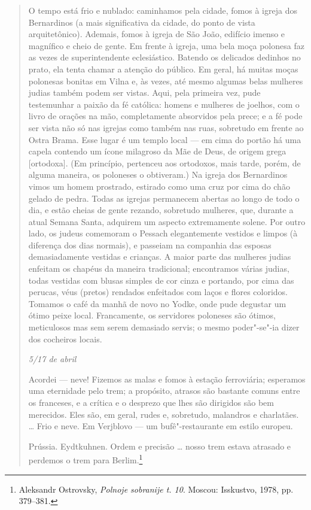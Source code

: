 \begin{quote}
O tempo está frio e nublado: caminhamos pela cidade, fomos à igreja dos
Bernardinos (a mais significativa da cidade, do ponto de vista
arquitetônico). Ademais, fomos à igreja de São João, edifício imenso e
magnífico e cheio de gente. Em frente à igreja, uma bela moça polonesa
faz as vezes de superintendente eclesiástico. Batendo os delicados
dedinhos no prato, ela tenta chamar a atenção do público. Em geral, há
muitas moças polonesas bonitas em Vilna e, às vezes, até mesmo algumas
belas mulheres judias também podem ser vistas. Aqui, pela primeira vez,
pude testemunhar a paixão da fé católica: homens e mulheres de joelhos,
com o livro de orações na mão, completamente absorvidos pela prece; e a
fé pode ser vista não só nas igrejas como também nas ruas, sobretudo em
frente ao Ostra Brama. Esse lugar é um templo local --- em cima do portão
há uma capela contendo um ícone milagroso da Mãe de Deus, de origem
grega {[}ortodoxa{]}. (Em princípio, pertenceu aos ortodoxos, mais
tarde, porém, de alguma maneira, os poloneses o obtiveram.) Na igreja
dos Bernardinos vimos um homem prostrado, estirado como uma cruz por
cima do chão gelado de pedra. Todas as igrejas permanecem abertas ao
longo de todo o dia, e estão cheias de gente rezando, sobretudo
mulheres, que, durante a atual Semana Santa, adquirem um aspecto
extremamente solene. Por outro lado, os judeus comemoram o Pessach
elegantemente vestidos e limpos (à diferença dos dias normais), e
passeiam na companhia das esposas demasiadamente vestidas e crianças. A
maior parte das mulheres judias enfeitam os chapéus da maneira
tradicional; encontramos várias judias, todas vestidas com blusas
simples de cor cinza e portando, por cima das perucas, véus (pretos)
rendados enfeitados com laços e flores coloridos. Tomamos o café da
manhã de novo no Yodke, onde pude degustar um ótimo peixe local.
Francamente, os servidores poloneses são ótimos, meticulosos mas sem
serem demasiado servis; o mesmo poder"-se"-ia dizer dos cocheiros locais.

\medskip
\textit{5/17 de abril}

Acordei --- neve! Fizemos as malas e fomos à estação ferroviária;
esperamos uma eternidade pelo trem; a propósito, atrasos são bastante
comuns entre os franceses, e a crítica e o desprezo que lhes são
dirigidos são bem merecidos. Eles são, em geral, rudes e, sobretudo,
malandros e charlatães. \ldots{} Frio e neve. Em Verjblovo --- um
bufê"-restaurante em estilo europeu.

Prússia. Eydtkuhnen. Ordem e precisão \ldots{} nosso trem estava
atrasado e perdemos o trem para Berlim.\footnote{Aleksandr Ostrovsky, \textit{Polnoje sobranije t. 10}. Moscou: Isskustvo, 1978, pp. 379--381.} 
\end{quote}

